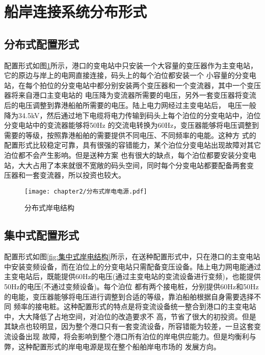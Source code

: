 \section{船岸连接系统分布形式}

\subsection{分布式配置形式}

配置形式如图\ref{fig:分布式岸电结构}所示，港口的变电站中只安装一个大容量的变压器作为主变电站，它的原边与岸上的电网直接连接，码头上的每个泊位都安装一个
小容量的分变电站，在每个拍位的分变电站中都分别安装两个变压器和一个变流器，其中一个变压器将来自港口主变电站的
电压降为变流器所需要的电压，另外一套变压器将变流后的电压调整到靠港船舶所需要的电压。陆上电力网经过主变电站后，
电压一般降为34.5kV，然后通过地下电缆将电力传输到码头上每个泊位的分变电站中，泊位分变电站中的变流器能够将50Hz
的交流电转换为60Hz，变压器能够将电压调整到需要的等级，按照靠港船舶的需要提供不同电压、不同频率的电能。这种方
式的配置形式比较稳定可靠，具有很强的容错能力，某个泊位分变电站出现故障对其它泊位都不会产生影响。但是送种方案
也有很大的缺点，每个泊位都要安装分变电站，大大占用了本来就很不宽敞的码头空间，同时每个分变电站都要配备两套变
压器和一套变流器，所以投资也较大。

\begin{figure}[!htp]
	\centering
	\texttt{[image: chapter2/分布式岸电电源.pdf]}
	\caption{分布式岸电结构}
	\label{fig:分布式岸电结构}
\end{figure}

\subsection{集中式配置形式}

配置形式如图\ref{fig:集中式岸电结构}所示，在送种配置形式中，只在港口的主变电站中安装变频设备，而在泊位上的分变电站只需配备变压设备。陆上电力网电能通过
主变电站后，既能提供60Hz的电压(通过主变电站的变流设备进行变频)，也能提供50Hz的电压(不通过变频设备)。每个泊位
都有两个接电桩，分别提供60Hz和50Hz的电能，变压器能够将电压进行调整到合适的等级，靠泊船舶根据自身需要选择不同
频率的接电粧。这种配置形式的特点是将变流设备统一整合到港口的主变电站中，大大降低了占地空间，对泊位的改造要求不
高，节省了很大的初投资。但是其缺点也较明显，因为整个港口只有一套变流设备，所容错能为较差，一旦这套变流设备出现
故障，将会影响到整个港口所有泊位的岸电供应能力。但是均衡利与弊，这种配置形式的岸电电源是现在整个船舶岸电市场的
发展方向。

